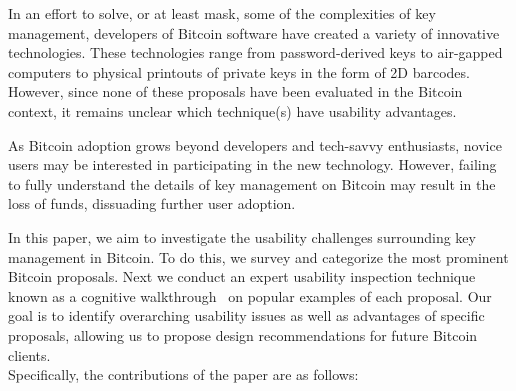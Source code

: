 In an effort to solve, or at least mask, some of the complexities of key management, developers of Bitcoin software have created a variety of innovative technologies. These technologies range  from password-derived keys to air-gapped computers to physical printouts of private keys in the form of 2D barcodes. However, since none of these proposals have been evaluated in the Bitcoin context, it remains unclear which technique(s) have usability advantages.

As Bitcoin adoption grows beyond developers and tech-savvy enthusiasts, novice users may be interested in participating in the new technology. However, failing to fully understand the details of key management on Bitcoin may result in the loss of funds, dissuading further user adoption. 

In this paper, we aim to investigate the usability challenges surrounding key management in Bitcoin. To do this, we survey and categorize the most prominent Bitcoin proposals. Next we conduct an expert usability inspection technique known as a cognitive walkthrough~\cite{WRLP94} on popular examples of each proposal. Our goal is to identify overarching usability issues as well as advantages of specific proposals, allowing us to propose design recommendations for future Bitcoin clients. \\



Specifically, the contributions of the paper are as follows:


